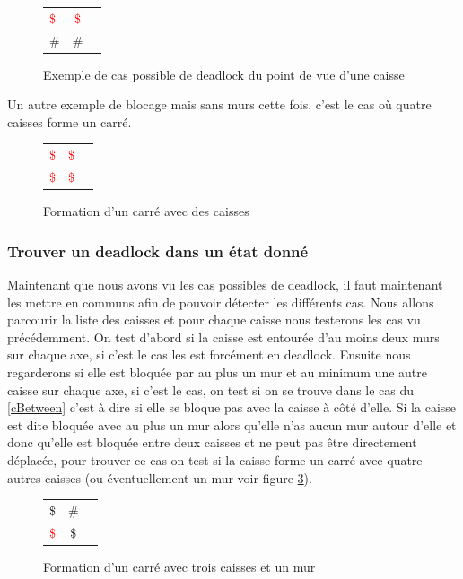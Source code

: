 \documentclass[a4paper,12pt]{article} %
\begin{document}
\begin{figure}[!h]
\centering
\begin{tabular}{ l c r }
\textcolor{red}{\$} & \textcolor{red}{\$} \\
\#                  &     \#              \\
\end{tabular}
\caption{Exemple de cas possible de deadlock du point de vue d'une caisse}
\label{DL2}
\end{figure}

Un autre exemple de blocage mais sans murs cette fois, c'est le cas où quatre caisses forme un carré.

\begin{figure}[!h]
\centering
\begin{tabular}{ l c r }
\textcolor{red}{\$} & \textcolor{red}{\$} \\
\textcolor{red}{\$} & \textcolor{red}{\$} \\
\end{tabular}
\caption{Formation d'un carré avec des caisses}
\label{DL2}
\end{figure}

\subsubsection{Trouver un deadlock dans un état donné}

Maintenant que nous avons vu les cas possibles de deadlock, il faut maintenant les mettre en communs afin de pouvoir détecter les différents cas. Nous allons parcourir la liste des caisses et pour chaque caisse nous testerons les cas vu précédemment. On test d'abord si la caisse est entourée d'au moins deux murs sur chaque axe, si c'est le cas les est forcément en deadlock. Ensuite nous regarderons si elle est bloquée par au plus un mur et au minimum une autre caisse sur chaque axe, si c'est le cas, on test si on se trouve dans le cas du \ref{cBetween} c'est à dire si elle se bloque pas avec la caisse à côté d'elle. Si la caisse est dite bloquée avec au plus un mur alors 
qu'elle n'as aucun mur autour d'elle et donc qu'elle est bloquée entre deux caisses et ne peut pas être directement déplacée, pour trouver ce cas on test si la caisse forme un carré avec quatre autres caisses (ou éventuellement un mur voir figure \ref{DLcarreMur}).

\begin{figure}[!h]
\centering
\begin{tabular}{ l c r }
\$                  & \# \\
\textcolor{red}{\$} & \$ \\
\end{tabular}
\caption{Formation d'un carré avec trois caisses et un mur}
\label{DLcarreMur}
\end{figure}
\end{document}

